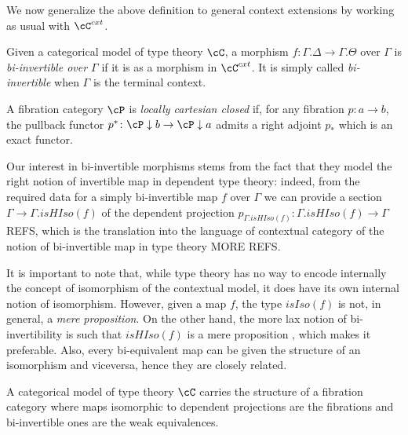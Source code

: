 \documentclass[a4paper,fontsize=12pt]{scrartcl}
\begin{document}
We now generalize the above definition to general context extensions by working
as usual with $\cC^{cxt}$.

\begin{defn}
  Given a categorical model of type theory $\cC$, a morphism
  $f\colon\Gamma.\Delta\rightarrow\Gamma.\Theta$ over $\Gamma$ is
  \emph{bi-invertible over $\Gamma$} if it is as a morphism in $\cC^{cxt}$. It
  is simply called \emph{bi-invertible} when $\Gamma$ is the terminal
  context.
\end{defn}

\begin{defn}
  A fibration category $\cP$ is \emph{locally cartesian closed} if, for any
  fibration $p\colon a\rightarrow b$, the pullback functor
  $p^*\colon\cP\downarrow b\rightarrow\cP\downarrow a$ admits a right adjoint
  $p_*$ which is an exact functor.
\end{defn}

\begin{rmk}
  Our interest in bi-invertible morphisms stems from the fact that they model
  the right notion of invertible map in dependent type theory: indeed, from the
  required data for a simply bi-invertible map $f$ over $\Gamma$ we can provide
  a section $\Gamma\rightarrow\Gamma. isHIso(f)$ of the dependent projection
  $p_{\Gamma.isHIso(f)}\colon\Gamma.isHIso(f)\rightarrow\Gamma$ REFS, which is
  the translation into the language of contextual category of the notion of
  bi-invertible map in type theory MORE REFS.

  It is important to note that, while type theory has no way to encode
  internally the concept of isomorphism of the contextual model, it does have
  its own internal notion of isomorphism. However, given a map $f$, the type
  $isIso(f)$ is not, in general, a \emph{mere proposition}. On the other hand,
  the more lax notion of bi-invertibility is such that $isHIso(f)$ is a mere
  proposition , which makes it
  preferable. Also, every bi-equivalent map can be given the structure of an
  isomorphism and viceversa, hence they are closely related.
\end{rmk}

\begin{prop}
  A categorical model of type theory $\cC$ carries the structure of a fibration
  category where maps isomorphic to dependent projections are the fibrations and
  bi-invertible ones are the weak equivalences.
\end{prop}
\end{document}
